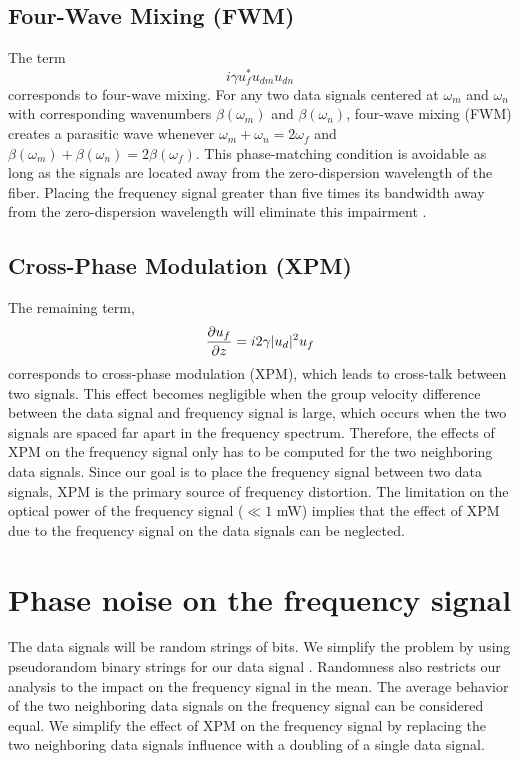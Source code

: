 \subsection{Four-Wave Mixing (FWM)}

The term
%
\begin{equation}
i\gamma u_f^*u_{dm}u_{dn}
\end{equation}
%
corresponds to four-wave mixing. For any two data signals centered at $\omega_m$ and $\omega_n$ with corresponding wavenumbers $\beta(\omega_m)$ and $\beta(\omega_n)$, four-wave mixing (FWM) creates a parasitic wave whenever $\omega_m + \omega_n = 2\omega_f$ and $\beta(\omega_m) + \beta(\omega_n) = 2\beta(\omega_f)$. This phase-matching condition is avoidable as long as the signals are located away from the zero-dispersion wavelength of the fiber. Placing the frequency signal greater than five times its bandwidth away from the zero-dispersion wavelength will eliminate this impairment \cite{menyukIFCS2015}.

\subsection{Cross-Phase Modulation (XPM)}

The remaining term,
\begin{equation}
\frac{\partial u_f}{\partial z} = i2\gamma|u_d|^2u_f
\end{equation}
corresponds to cross-phase modulation (XPM), which leads to cross-talk between two signals. This effect becomes negligible when the group velocity difference between the data signal and frequency signal is large, which occurs when the two signals are spaced far apart in the frequency spectrum. Therefore, the effects of XPM on the frequency signal only has to be computed for the two neighboring data signals. Since our goal is to place the frequency signal between two data signals, XPM is the primary source of frequency distortion. The limitation on the optical power of the frequency signal ($\ll 1$ mW) implies that the effect of XPM due to the frequency signal on the data signals can be neglected.

\section{Phase noise on the frequency signal} \label{sec:noisexpm}

The data signals will be random strings of bits. We simplify the problem by using pseudorandom binary strings for our data signal \cite{PRBS}. Randomness also restricts our analysis to the impact on the frequency signal in the mean. The average behavior of the two neighboring data signals on the frequency signal can be considered equal. We simplify the effect of XPM on the frequency signal by replacing the two neighboring data signals influence with a doubling of a single data signal.

